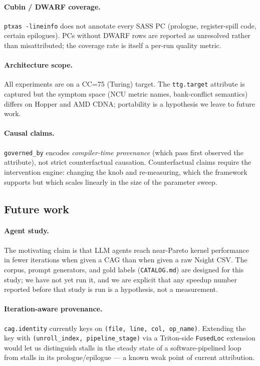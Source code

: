 \documentclass[10pt]{article}
\begin{document}
\paragraph{Cubin / DWARF coverage.} \texttt{ptxas -lineinfo} does not annotate every SASS PC (prologue, register-spill code, certain epilogues). PCs without DWARF rows are reported as unresolved rather than misattributed; the coverage rate is itself a per-run quality metric.

\paragraph{Architecture scope.} All experiments are on a CC=75 (Turing) target. The \texttt{ttg.target} attribute is captured but the symptom space (NCU metric names, bank-conflict semantics) differs on Hopper and AMD CDNA; portability is a hypothesis we leave to future work.

\paragraph{Causal claims.} \texttt{governed\_by} encodes \emph{compiler-time provenance} (which pass first observed the attribute), not strict counterfactual causation. Counterfactual claims require the intervention engine: changing the knob and re-measuring, which the framework supports but which scales linearly in the size of the parameter sweep.

\subsection{Future work}\label{sec:future}

\paragraph{Agent study.} The motivating claim is that LLM agents reach near-Pareto kernel performance in fewer iterations when given a CAG than when given a raw Nsight CSV. The corpus, prompt generators, and gold labels (\texttt{CATALOG.md}) are designed for this study; we have not yet run it, and we are explicit that any speedup number reported before that study is run is a hypothesis, not a measurement.

\paragraph{Iteration-aware provenance.} \texttt{cag.identity} currently keys on \texttt{(file, line, col, op\_name)}. Extending the key with \texttt{(unroll\_index, pipeline\_stage)} via a Triton-side \texttt{FusedLoc} extension would let us distinguish stalls in the steady state of a software-pipelined loop from stalls in its prologue/epilogue --- a known weak point of current attribution.
\end{document}
